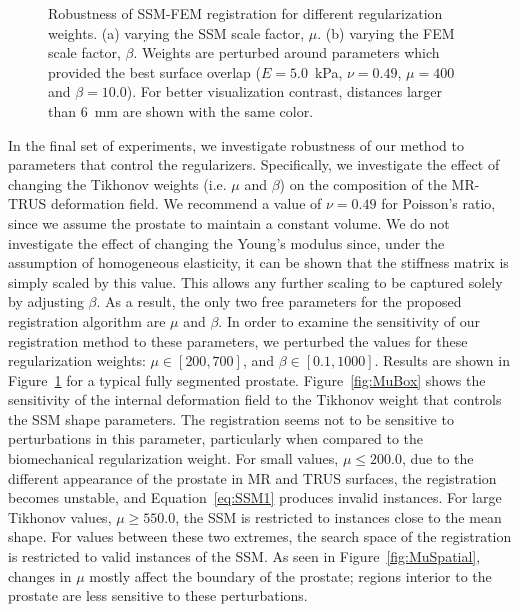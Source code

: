\documentclass[journal]{IEEEtran}
\begin{document}
\begin{figure}[t]
	\hfill
	
	\caption{Robustness of SSM-FEM registration for different regularization weights. (a) varying the SSM scale factor, $\mu$. (b) varying the FEM scale factor, $\beta$. Weights are perturbed around parameters which provided the best surface overlap ($E=5.0$~kPa, $\nu=0.49$, $\mu=400$ and $\beta=10.0$). For better visualization contrast, distances larger than 6~mm are shown with the same color.}\label{fig:Perturb}
\end{figure} 

In the final set of experiments, we investigate robustness of our method to parameters that control the regularizers. Specifically, we investigate the effect of changing the Tikhonov weights (i.e. $\mu$ and $\beta$) on the composition of the MR-TRUS deformation field. We recommend a value of $\nu=0.49$ for Poisson's ratio, since we assume the prostate to maintain a constant volume. We do not investigate the effect of changing the Young's modulus since, under the assumption of homogeneous elasticity, it can be shown that the stiffness matrix is simply scaled by this value.  This allows any further scaling to be captured solely by adjusting $\beta$. As a result, the only two free parameters for the proposed registration algorithm are $\mu$ and $\beta$. In order to examine the sensitivity of our registration method to these parameters, we perturbed the values for these regularization weights: $\mu\in[200,700]$, and $\beta\in[0.1,1000]$.  Results are shown in Figure~\ref{fig:Perturb} for a typical fully segmented prostate.
Figure~\ref{fig:MuBox} shows the sensitivity of the internal deformation field to the Tikhonov weight that controls the SSM shape parameters. The registration seems not to be sensitive to perturbations in this parameter, particularly when compared to the biomechanical regularization weight. For small values, $\mu\leq200.0$, due to the different appearance of the prostate in MR and TRUS surfaces, the registration becomes unstable, and Equation~\eqref{eq:SSM1} produces invalid instances. For large Tikhonov values, $\mu\geq550.0$, the SSM is restricted to instances close to the mean shape. For values between these two extremes, the search space of the registration is restricted to valid instances of the SSM. As seen in Figure~\ref{fig:MuSpatial}, changes in $\mu$ mostly affect the boundary of the prostate; regions interior to the prostate are less sensitive to these perturbations.
\end{document}
